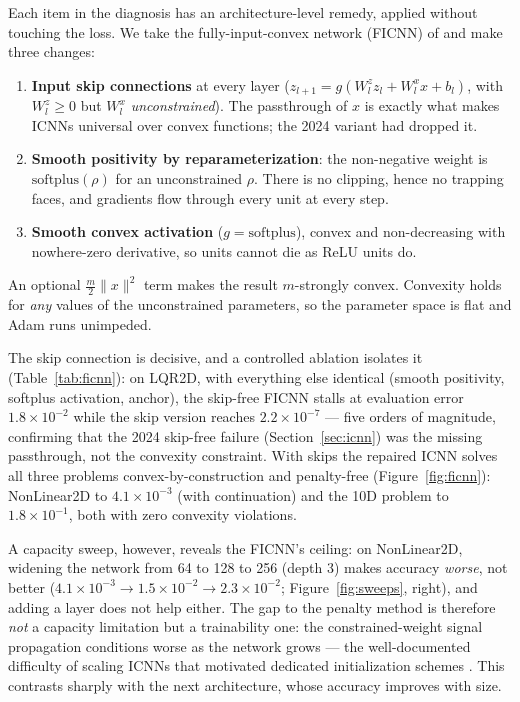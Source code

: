 \documentclass[11pt,a4paper]{article}
\begin{document}
Each item in the diagnosis has an architecture-level remedy, applied without
touching the loss. We take the fully-input-convex network (FICNN) of
\cite{amos2017input} and make three changes:
\begin{enumerate}[itemsep=1pt]
  \item \textbf{Input skip connections} at every layer
        ($z_{l+1} = g(W^z_l z_l + W^x_l x + b_l)$, with $W^z_l \ge 0$ but
        $W^x_l$ \emph{unconstrained}). The passthrough of $x$ is exactly what
        makes ICNNs universal over convex functions; the 2024 variant had
        dropped it.
  \item \textbf{Smooth positivity by reparameterization}: the non-negative
        weight is $\mathrm{softplus}(\rho)$ for an unconstrained $\rho$. There
        is no clipping, hence no trapping faces, and gradients flow through
        every unit at every step.
  \item \textbf{Smooth convex activation} ($g = \mathrm{softplus}$), convex
        and non-decreasing with nowhere-zero derivative, so units cannot die
        as ReLU units do.
\end{enumerate}
An optional $\tfrac{m}{2}\|x\|^2$ term makes the result $m$-strongly convex.
Convexity holds for \emph{any} values of the unconstrained parameters, so the
parameter space is flat and Adam runs unimpeded.

The skip connection is decisive, and a controlled ablation isolates it
(Table~\ref{tab:ficnn}): on LQR2D, with everything else identical (smooth
positivity, softplus activation, anchor), the skip-free FICNN stalls at
evaluation error $1.8\times10^{-2}$ while the skip version reaches
$2.2\times10^{-7}$ --- five orders of magnitude, confirming that the
2024 skip-free failure (Section~\ref{sec:icnn}) was the missing passthrough,
not the convexity constraint. With skips the repaired ICNN solves all three
problems convex-by-construction and penalty-free
(Figure~\ref{fig:ficnn}): NonLinear2D to $4.1\times10^{-3}$ (with
continuation) and the 10D problem to $1.8\times10^{-1}$, both with zero
convexity violations.

A capacity sweep, however, reveals the FICNN's ceiling: on NonLinear2D,
widening the network from 64 to 128 to 256 (depth 3) makes accuracy
\emph{worse}, not better ($4.1\times10^{-3} \to 1.5\times10^{-2} \to
2.3\times10^{-2}$; Figure~\ref{fig:sweeps}, right), and adding a layer does
not help either. The gap to the penalty method is therefore \emph{not} a
capacity limitation but a trainability one: the constrained-weight signal
propagation conditions worse as the network grows --- the well-documented
difficulty of scaling ICNNs that motivated dedicated initialization schemes
\cite{hoedt2023principled}. This contrasts sharply with the next architecture,
whose accuracy improves with size.
\end{document}
